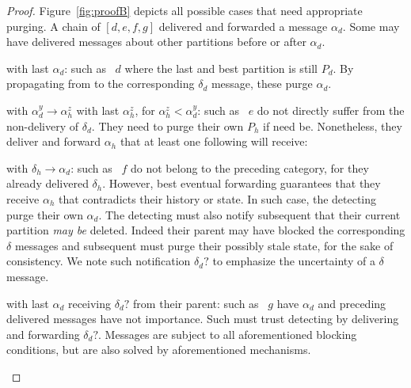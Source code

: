\begin{proof}
  Figure~\ref{fig:proofB} depicts all possible cases that need
  appropriate purging. A chain of \processes $[d, e, f, g]$ delivered
  and forwarded a message $\alpha_d$. Some \processes may have
  delivered messages about other partitions before or after
  $\alpha_d$.
  \begin{asparadesc}
  \item [\processes with last $\alpha_d$:] \Processes such as
    \Process~$d$ where the last and best partition is still $P_d$. By
    propagating from \process to \process the corresponding $\delta_d$
    message, these \processes purge $\alpha_d$.
  \item [\processes with $\alpha_d^y \rightarrow \alpha_h^z$ with last
    $\alpha_h^z$, for $\alpha_h^z < \alpha_d^y$:] \Processes such as
    \Process~$e$ do not directly suffer from the non-delivery of
    $\delta_d$. They need to purge their own $P_h$ if need
    be. Nonetheless, they deliver and forward $\alpha_h$ that at least
    one following \process will receive:
  \item [\processes with $\delta_h \rightarrow \alpha_d$:] \Processes
    such as \Process~$f$ do not belong to the preceding category, for
    they already delivered $\delta_h$. However, best eventual
    forwarding guarantees that they receive $\alpha_h$ that
    contradicts their history or state. In such case, the detecting
    \processes purge their own $\alpha_d$. The detecting \processes
    must also notify subsequent \processes that their current
    partition \emph{may be} deleted. Indeed their parent may have
    blocked the corresponding $\delta$ messages and subsequent
    \processes must purge their possibly stale state, for the sake of
    consistency.  We note such notification $\delta_d?$ to emphasize
    the uncertainty of a $\delta$ message.
  \item [\processes with last $\alpha_d$ receiving $\delta_d?$ from
    their parent:] \Processes such as \Process~$g$ have $\alpha_d$ and
    preceding delivered messages have not importance. Such \processes
    must trust detecting \processes by delivering and forwarding
    $\delta_d?$. Messages are subject to all aforementioned blocking
    conditions, but are also solved by aforementioned mechanisms.
  \end{asparadesc}


\end{proof}
